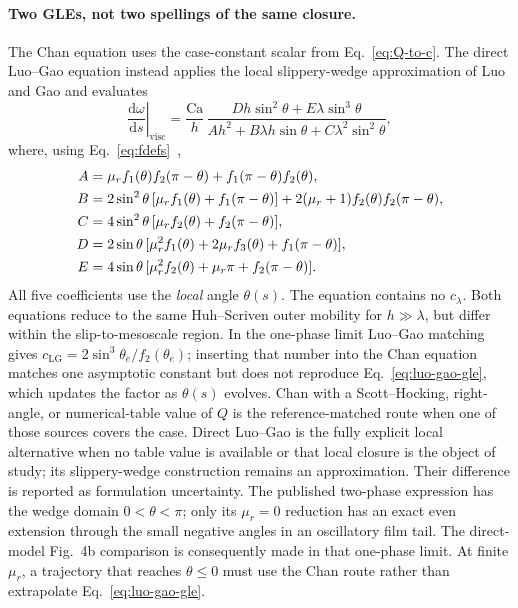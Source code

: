 \documentclass[11pt,a4paper]{article}
\newcommand{\Ca}{\mathrm{Ca}}
\newcommand{\dd}{\mathrm{d}}
\newcommand{\mur}{\mu_r}
\begin{document}
\paragraph{Two GLEs, not two spellings of the same closure.}
The Chan equation uses the case-constant scalar from
Eq.~\eqref{eq:Q-to-c}. The direct Luo--Gao equation instead applies the local
slippery-wedge approximation of Luo and Gao and evaluates
\cite[Eq.~3.16]{luo2025}
\begin{equation}
  \left.\frac{\dd\omega}{\dd s}\right|_{\mathrm{visc}}
  =\frac{\Ca}{h}\,
   \frac{D h\sin^2\theta+E\lambda\sin^3\theta}
        {A h^2+B\lambda h\sin\theta+C\lambda^2\sin^2\theta},
  \label{eq:luo-gao-gle}
\end{equation}
where, using Eq.~\eqref{eq:fdefs}~\cite[Eq.~3.17]{luo2025},
\begin{align}
  A={}&\mur f_1(\theta)f_2(\pi-\theta)
       +f_1(\pi-\theta)f_2(\theta), \notag\\
  B={}&2\sin^2\theta\,[\mur f_1(\theta)+f_1(\pi-\theta)]
       +2(\mur+1)f_2(\theta)f_2(\pi-\theta), \notag\\
  C={}&4\sin^2\theta\,[\mur f_2(\theta)+f_2(\pi-\theta)], \notag\\
  D={}&2\sin\theta\,[\mur^2 f_1(\theta)+2\mur f_3(\theta)
       +f_1(\pi-\theta)], \notag\\
  E={}&4\sin\theta\,[\mur^2 f_2(\theta)+\mur\pi+f_2(\pi-\theta)].
  \label{eq:luo-gao-coefficients}
\end{align}
All five coefficients use the \emph{local} angle $\theta(s)$. The equation
contains no $c_{\lambda}$. Both equations reduce to the same
Huh--Scriven outer mobility for $h\gg\lambda$, but differ within the
slip-to-mesoscale region. In the one-phase limit Luo--Gao matching gives
$c_{\mathrm{LG}}=2\sin^3\theta_e/f_2(\theta_e)$; inserting that number into
the Chan equation matches one asymptotic constant but does not reproduce
Eq.~\eqref{eq:luo-gao-gle}, which updates the factor as $\theta(s)$ evolves.
Chan with a Scott--Hocking, right-angle, or numerical-table value of $Q$ is the
reference-matched route when one of those sources covers the case. Direct
Luo--Gao is the fully explicit local alternative when no table value is
available or that local closure is the object of study; its slippery-wedge
construction remains an approximation. Their difference is reported as
formulation uncertainty. The published two-phase
expression has the wedge domain $0<\theta<\pi$; only its $\mur=0$ reduction
has an exact even extension through the small negative angles in an oscillatory
film tail. The direct-model Fig.~4b comparison is consequently made in that
one-phase limit. At finite $\mur$, a trajectory that reaches $\theta\leq0$
must use the Chan route rather than extrapolate Eq.~\eqref{eq:luo-gao-gle}.
\end{document}
